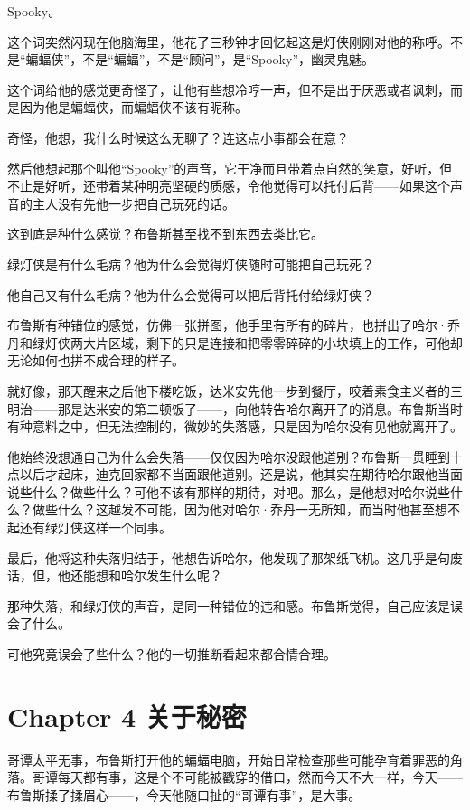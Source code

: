 \documentclass[../main.tex]{subfiles}
\begin{document}
Spooky。

这个词突然闪现在他脑海里，他花了三秒钟才回忆起这是灯侠刚刚对他的称呼。不是“蝙蝠侠”，不是“蝙蝠”，不是“顾问”，是“Spooky”，幽灵鬼魅。

这个词给他的感觉更奇怪了，让他有些想冷哼一声，但不是出于厌恶或者讽刺，而是因为他是蝙蝠侠，而蝙蝠侠不该有昵称。

奇怪，他想，我什么时候这么无聊了？连这点小事都会在意？

然后他想起那个叫他“Spooky”的声音，它干净而且带着点自然的笑意，好听，但不止是好听，还带着某种明亮坚硬的质感，令他觉得可以托付后背——如果这个声音的主人没有先他一步把自己玩死的话。

这到底是种什么感觉？布鲁斯甚至找不到东西去类比它。

绿灯侠是有什么毛病？他为什么会觉得灯侠随时可能把自己玩死？

他自己又有什么毛病？他为什么会觉得可以把后背托付给绿灯侠？

布鲁斯有种错位的感觉，仿佛一张拼图，他手里有所有的碎片，也拼出了哈尔·乔丹和绿灯侠两大片区域，剩下的只是连接和把零零碎碎的小块填上的工作，可他却无论如何也拼不成合理的样子。

就好像，那天醒来之后他下楼吃饭，达米安先他一步到餐厅，咬着素食主义者的三明治——那是达米安的第二顿饭了——，向他转告哈尔离开了的消息。布鲁斯当时有种意料之中，但无法控制的，微妙的失落感，只是因为哈尔没有见他就离开了。

他始终没想通自己为什么会失落——仅仅因为哈尔没跟他道别？布鲁斯一贯睡到十点以后才起床，迪克回家都不当面跟他道别。还是说，他其实在期待哈尔跟他当面说些什么？做些什么？可他不该有那样的期待，对吧。那么，是他想对哈尔说些什么？做些什么？这越发不可能，因为他对哈尔·乔丹一无所知，而当时他甚至想不起还有绿灯侠这样一个同事。

最后，他将这种失落归结于，他想告诉哈尔，他发现了那架纸飞机。这几乎是句废话，但，他还能想和哈尔发生什么呢？

那种失落，和绿灯侠的声音，是同一种错位的违和感。布鲁斯觉得，自己应该是误会了什么。

可他究竟误会了些什么？他的一切推断看起来都合情合理。

\section*{Chapter 4\hspace{1em} 关于秘密}

哥谭太平无事，布鲁斯打开他的蝙蝠电脑，开始日常检查那些可能孕育着罪恶的角落。哥谭每天都有事，这是个不可能被戳穿的借口，然而今天不大一样，今天——布鲁斯揉了揉眉心——，今天他随口扯的“哥谭有事”，是大事。
\end{document}
